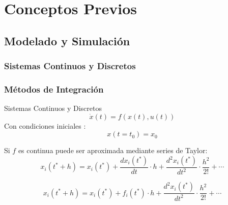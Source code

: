 \documentclass{beamer}
\begin{document}
\chapter{Conceptos Previos}
\section{Modelado y Simulación}
\subsection{Sistemas Continuos y Discretos}
\subsection{Métodos de Integración}
\begin{frame}{Sistemas Continuos y Discretos}
	\begin{equation*} 
	\dot{x}(t) = f (x(t), u(t))
	\end{equation*}
	Con condiciones iniciales :
	\begin{equation*}
	x(t = t_0 ) = x_0
	\end{equation*}

	Si $f$ es continua puede ser aproximada mediante series de Taylor:
	\begin{equation*}
		x_i(t^* + h) = x_i(t^*) + \frac{dx_i (t^*)}{dt} \cdot h + \frac{d^{2}x_i (t^*)}{dt^2} \cdot \frac{h^2}{2!} + \cdots
	\end{equation*}

	\begin{equation*}
		x_i(t^* + h) = x_i(t^*) + f_i(t^*) \cdot h + \frac{d^{2}x_i (t^*)}{dt^2} \cdot \frac{h^2}{2!} + \cdots
	\end{equation*}

\end{frame}
\end{document}
